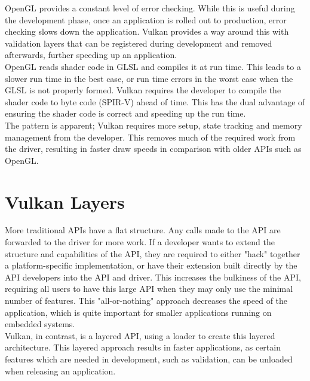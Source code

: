 \documentclass[12pt]{report}
\theoremstyle{definition}
\begin{document}
      OpenGL provides a constant level of error checking. While this is useful
      during the development phase, once an application is rolled out to
      production, error checking slows down the application. Vulkan provides
      a way around this with validation layers that can be registered during
      development and removed afterwards, further speeding up an application. \\

      OpenGL reads shader code in GLSL and compiles it at run time. This leads
      to a slower run time in the best case, or run time errors in the worst
      case when the GLSL is not properly formed. Vulkan requires the developer
      to compile the shader code to byte code (SPIR-V) ahead of time. 
      This has the dual advantage of ensuring the shader
      code is correct and speeding up the run time. \\

      The pattern is apparent; Vulkan requires more setup, state tracking and
      memory management from the developer. This removes much of the required
      work from the driver, resulting in faster draw speeds in comparison
      with older APIs such as OpenGL.

    \section{Vulkan Layers}

      More traditional APIs have a flat structure. Any calls made to the API are
      forwarded to the driver for more work. If a developer wants to extend the
      structure and capabilities of the API, they are required to either "hack"
      together a platform-specific implementation, or have their extension
      built directly by the API developers into the API and driver. This
      increases the bulkiness of the API, requiring all users to have
      this large API when they may only use the minimal number of features.
      This "all-or-nothing" approach decreases the speed of the application,
      which is quite important for smaller applications running on embedded
      systems. \\

      Vulkan, in contrast, is a layered API, using a loader to create this
      layered architecture. This layered approach results in faster
      applications, as certain features which are needed in development,
      such as validation, can be unloaded when releasing an application.
\end{document}
